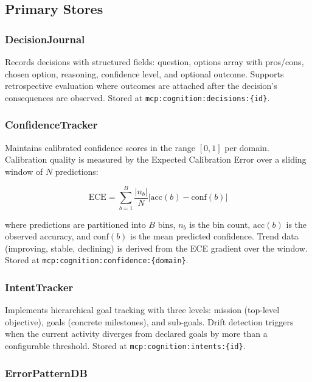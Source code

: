 \documentclass[journal,10pt]{IEEEtran}
\newcommand{\code}[1]{\texttt{#1}}
\begin{document}
\subsection{Primary Stores}

\subsubsection{DecisionJournal}

Records decisions with structured fields: question, options array with pros/cons, chosen option, reasoning, confidence level, and optional outcome. Supports retrospective evaluation where outcomes are attached after the decision's consequences are observed. Stored at \code{mcp:cognition:decisions:\{id\}}.

\subsubsection{ConfidenceTracker}

Maintains calibrated confidence scores in the range $[0, 1]$ per domain. Calibration quality is measured by the Expected Calibration Error over a sliding window of $N$ predictions:

\begin{equation}
\text{ECE} = \sum_{b=1}^{B} \frac{|n_b|}{N} \left| \text{acc}(b) - \text{conf}(b) \right|
\label{eq:ece}
\end{equation}

\noindent where predictions are partitioned into $B$ bins, $n_b$ is the bin count, $\text{acc}(b)$ is the observed accuracy, and $\text{conf}(b)$ is the mean predicted confidence. Trend data (improving, stable, declining) is derived from the ECE gradient over the window. Stored at \code{mcp:cognition:confidence:\{domain\}}.

\subsubsection{IntentTracker}

Implements hierarchical goal tracking with three levels: mission (top-level objective), goals (concrete milestones), and sub-goals. Drift detection triggers when the current activity diverges from declared goals by more than a configurable threshold. Stored at \code{mcp:cognition:intents:\{id\}}.

\subsubsection{ErrorPatternDB}
\end{document}
